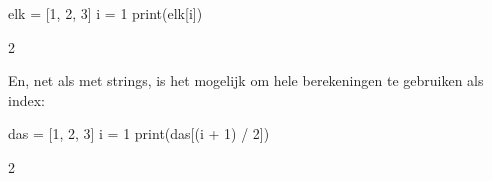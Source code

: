 \begin{minipage}[t]{0.5\textwidth}
\begin{listing}
elk = [1, 2, 3]
i = 1
print(elk[i])
\end{listing}
\end{minipage}
\begin{minipage}[t]{0.5\textwidth}
\begin{listing}
2
\end{listing}
\end{minipage}

En, net als met strings, is het mogelijk om hele berekeningen te gebruiken als index:

\begin{minipage}[t]{0.5\textwidth}
\begin{listing}
das = [1, 2, 3]
i = 1
print(das[(i + 1) / 2])
\end{listing}
\end{minipage}
\begin{minipage}[t]{0.5\textwidth}
\begin{listing}
2
\end{listing}
\end{minipage}
